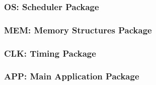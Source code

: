 \subsubsection{OS: Scheduler Package}
%
\subsubsection{MEM: Memory Structures Package}
%
\subsubsection{CLK: Timing Package}
%

%
\subsubsection{APP: Main Application Package}
%
